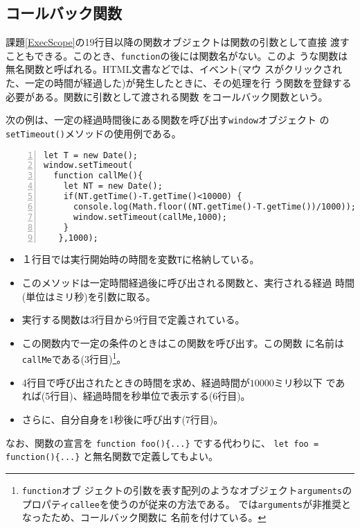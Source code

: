 \subsection{コールバック関数}
課題\ref{ExecScope}の19行目以降の関数オブジェクトは関数の引数として直接
渡すこともできる。このとき、\Verb+function+の後には関数名がない。このよ
うな関数は無名関数と呼ばれる。HTML文書などでは、イベント(マウ
スがクリックされた、一定の時間が経過した)が発生したときに、その処理を行
う関数を登録する必要がある。関数に引数として渡される関数
をコールバック関数という。
\begin{Exec}\upshape
 次の例は、一定の経過時間後にある関数を呼び出す\Verb+window+オブジェクト
 の\Verb+setTimeout()+メソッドの使用例である。
\begin{Verbatim}[numbers=left]
let T = new Date();
window.setTimeout(
  function callMe(){
    let NT = new Date();
    if(NT.getTime()-T.getTime()<10000) {
      console.log(Math.floor((NT.getTime()-T.getTime())/1000));
      window.setTimeout(callMe,1000);
    }
   },1000);
\end{Verbatim}
\begin{itemize}
 \item １行目では実行開始時の時間を変数\Verb+T+に格納している。
 \item このメソッドは一定時間経過後に呼び出される関数と、実行される経過
       時間(単位はミリ秒)を引数に取る。
 \item 実行する関数は3行目から9行目で定義されている。
 \item この関数内で一定の条件のときはこの関数を呼び出す。この関数
       に名前は\Verb+callMe+である(3行目)\footnote{\Verb+function+オブ
       ジェクトの引数を表す配列のようなオブジェクト\Verb+arguments+の
       プロパティ\texttt{callee}を使うのが従来の方法である。
       \ES では\Verb+arguments+が非推奨となったため、コールバック関数に
       名前を付けている。}。
 \item 4行目で呼び出されたときの時間を求め、経過時間が$10000$ミリ秒以下
       であれば(5行目)、経過時間を秒単位で表示する(6行目)。
 \item さらに、自分自身を1秒後に呼び出す(7行目)。

\iffalse			 非\Strict では
       \Verb+arguments+を仮引数としてもつ関数を\Verb+arguments.callee+で
       呼び出すことができる。つまり自分自身を呼び出せることとなる。
       \Strict では\Verb+arguments.callee+は使用できないので3行目の関数
       に名前を付けてその関数名を\Verb+arguments.callee+の代わりに用いる
       必要がある。
			 \fi
\end{itemize}
\end{Exec}
なお、関数の宣言を \Verb+function foo(){...}+ でする代わりに、
{\Verb+let foo = function(){...}+} と無名関数で定義してもよい。


